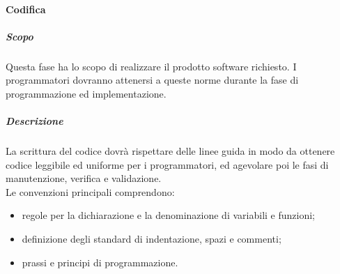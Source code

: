 			\paragraph{Codifica}
			\subparagraph{Scopo}
			Questa fase ha lo scopo di realizzare il prodotto software richiesto. I programmatori dovranno attenersi a queste norme durante la fase di programmazione ed implementazione.
			\subparagraph{Descrizione}
			La scrittura del codice dovrà rispettare delle linee guida in modo da ottenere codice leggibile ed uniforme per i programmatori, ed agevolare poi le fasi di manutenzione, verifica e validazione. \\
			Le convenzioni principali comprendono:
			\begin{itemize}
				\item regole per la dichiarazione e la denominazione di variabili e funzioni;
				\item definizione degli standard di indentazione, spazi e commenti;
				\item prassi e principi di programmazione.
			\end{itemize}